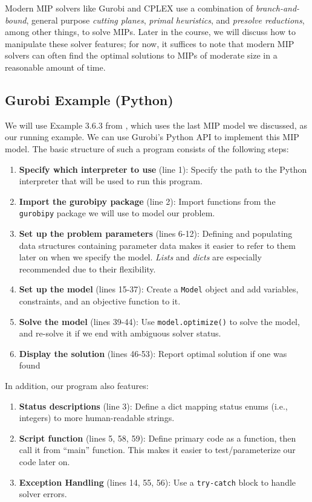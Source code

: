 \documentclass[12pt]{article}
\begin{document}
Modern MIP solvers like Gurobi and CPLEX use a combination of \emph{branch-and-bound}, general purpose \emph{cutting planes}, \emph{primal heuristics}, and \emph{presolve reductions}, among other things, to solve MIPs. Later in the course, we will discuss how to manipulate these solver features; for now, it suffices to note that modern MIP solvers can often find the optimal solutions to MIPs of moderate size in a reasonable amount of time.



\subsection{Gurobi Example (Python)}
We will use Example 3.6.3 from \cite{pinedo2012scheduling}, which uses the last MIP model we discussed, as our running example. We can use Gurobi's Python API to implement this MIP model. The basic structure of such a program consists of the following steps:
\begin{enumerate}
    \item \textbf{Specify which interpreter to use} (line 1): Specify the path to the Python interpreter that will be used to run this program.
    \item \textbf{Import the gurobipy package} (line 2): Import functions from the \texttt{gurobipy} package we will use to model our problem.
    \item \textbf{Set up the problem parameters} (lines 6-12): Defining and populating data structures containing parameter data makes it easier to refer to them later on when we specify the model. \emph{Lists} and \emph{dicts} are especially recommended due to their flexibility.
    \item \textbf{Set up the model} (lines 15-37): Create a \texttt{Model} object and add variables, constraints, and an objective function to it.
    \item \textbf{Solve the model} (lines 39-44): Use \texttt{model.optimize()} to solve the model, and re-solve it if we end with ambiguous solver status.
    \item \textbf{Display the solution} (lines 46-53): Report optimal solution if one was found
\end{enumerate}
In addition, our program also features:
\begin{enumerate}
    \item \textbf{Status descriptions} (line 3): Define a dict mapping status enums (i.e., integers) to more human-readable strings.
    \item \textbf{Script function} (lines 5, 58, 59): Define primary code as a function, then call it from ``main'' function. This makes it easier to test/parameterize our code later on.
    \item \textbf{Exception Handling} (lines 14, 55, 56): Use a \texttt{try-catch} block to handle solver errors.
\end{enumerate}
\end{document}
